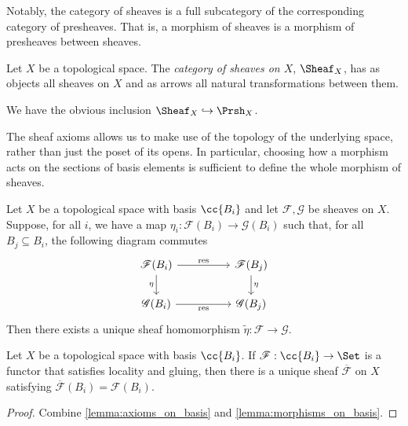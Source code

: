\documentclass{article}
\begin{document}
Notably, the category of sheaves is a full subcategory
of the corresponding category of presheaves. That is, a morphism
of sheaves is a morphism of presheaves between sheaves.

\begin{definition}
  Let $X$ be a topological space. The \emph{category of sheaves on $X$},
  $\Sheaf_X$, has as objects all sheaves on $X$ and as arrows all natural
  transformations between them.
\end{definition}

We have the obvious inclusion $\Sheaf_X\hookrightarrow \Prsh_X$.

The sheaf axioms allows us to make use of the topology of the underlying
space, rather than just the poset of its opens. In particular, choosing
how a morphism acts on the sections of basis elements is sufficient
to define the whole morphism of sheaves.

\begin{lemma}\label{lemma:morphisms_on_basis}
  Let $X$ be a topological space with basis $\cc{B_i}$ and let $\mathscr
  F,\mathscr G$ be sheaves on $X$. Suppose, for all $i$, we have a map
  $\eta_i:\mathscr F(B_i)\to \mathscr G(B_i)$ such that, for all $B_j\subseteq
  B_i$, the following diagram commutes
  \begin{equation}
    \begin{tikzcd}
      \mathscr F(B_i) && \mathscr F(B_j) \\
      \mathscr G(B_i) && \mathscr G(B_j)
      \arrow["\mathscr \res", from=1-1, to=1-3]
      \arrow["{\eta}"', from=1-1, to=2-1]
      \arrow["{\eta}", from=1-3, to=2-3]
      \arrow["\mathscr \res"', from=2-1, to=2-3]
    \end{tikzcd}
  \end{equation}
  Then there exists a unique sheaf homomorphism $\tilde\eta : \mathscr F\to \mathscr G$.
\end{lemma}

\begin{theorem}
  Let $X$ be a topological space with basis $\cc{B_i}$. If $\mathscr F :
  \cc{B_i} \to \Set$ is a functor that satisfies locality and gluing, then
  there is a unique sheaf $\overline{\mathscr F}$ on $X$ satisfying
  $\overline{\mathscr F}(B_i)=\mathscr F(B_i)$.
  \begin{proof}
    Combine \ref{lemma:axioms_on_basis} and \ref{lemma:morphisms_on_basis}.
  \end{proof}
\end{theorem}
\end{document}
